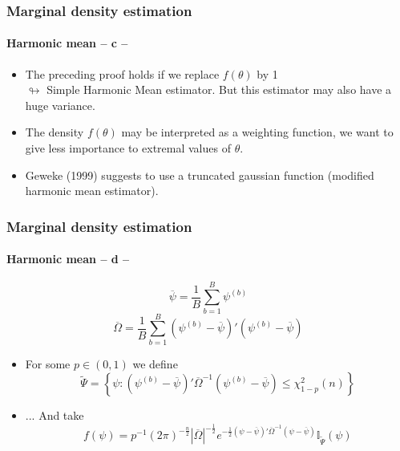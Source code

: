 \documentclass[10pt,slidestop]{beamer}
\begin{document}
\begin{frame}
  \frametitle{Marginal density estimation}
  \framesubtitle{Harmonic mean -- c --}

    \begin{itemize}
        \item The preceding proof holds if we replace
        $f(\theta)$ by 1\\ $\looparrowright$ Simple Harmonic Mean
        estimator. But this estimator may also have a huge
        variance.

\bigskip

        \item The density $f(\theta)$ may be interpreted as a
        weighting function, we want to give less importance to extremal values of
        $\theta$.

\bigskip

        \item Geweke (1999) suggests to use a truncated gaussian
        function (modified harmonic mean estimator).

    \end{itemize}

\end{frame}

\begin{frame}
  \frametitle{Marginal density estimation}
  \framesubtitle{Harmonic mean -- d --}


{\footnotesize
\[ \overline{\psi} =
\frac{1}{B}\sum_{b=1}^B\psi^{(b)}
\]
}
{\footnotesize
\[ \overline{\Omega} =
\frac{1}{B}\sum_{b=1}^B(\psi^{(b)}-\overline{\psi})'(\psi^{(b)}
-\overline{\psi})
\]
}

\bigskip

\begin{itemize}
    \item For some $p\in (0,1)$ we define
    {\footnotesize
    \[\widetilde{\Psi} =
\left\{\psi:(\psi^{(b)}-\overline{\psi})'\overline{\Omega
}^{-1}(\psi^{(b)}-\overline{\psi})\leq
    \chi_{1-p}^2(n)\right\}
    \]}

\bigskip

    \item ... And take
    {\footnotesize
    \[
        f(\psi) =
p^{-1}(2\pi)^{-\frac{n}{2}}|\overline{\Omega}|^{-\frac{1}{2}}e^{-\frac{1}{2}(\psi
-\overline{\psi})'\overline{\Omega}^{-1}(\psi-\overline{\psi})}\mathbb{I}_{
\widetilde{\Psi}}(\psi)
    \]}
\end{itemize}

\end{frame}
\end{document}
